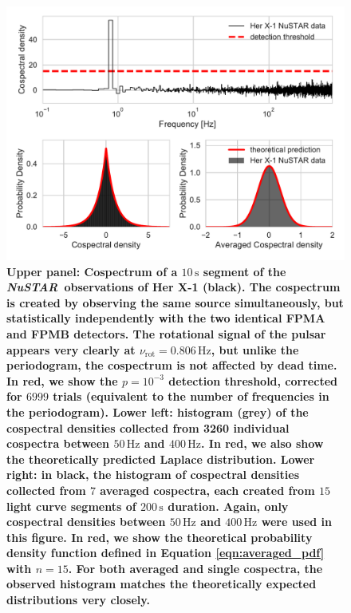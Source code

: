 \documentclass[12pt]{emulateapj}
\newcommand{\project}[1]{\textsl{#1}}
\newcommand{\nustar}{\project{NuSTAR}\xspace}
\begin{document}
\begin{bf}
\begin{figure}
\begin{center}
\includegraphics[width=\textwidth]{nustar_cospectra.pdf}
\caption{\textbf{Upper panel: Cospectrum of a $10\,\mathrm{s}$ segment of the \nustar\ observations of Her X-1 (black). The cospectrum is created by observing the same source simultaneously, but statistically independently with the two identical FPMA and FPMB detectors. The rotational signal of the pulsar appears very clearly at $\nu_\mathrm{rot} = 0.806\,\mathrm{Hz}$, but unlike the periodogram, the cospectrum is not affected by dead time. In red, we show the $p = 10^{-3}$ detection threshold, corrected for $6999$ trials (equivalent to the number of frequencies in the periodogram). Lower left:  histogram (grey) of the cospectral densities collected from 3260 individual cospectra between $50\,\mathrm{Hz}$ and $400\,\mathrm{Hz}$. In red, we also show the theoretically predicted Laplace distribution. Lower right: in black, the histogram of cospectral densities collected from $7$ averaged cospectra, each created from $15$ light curve segments of $200\,\mathrm{s}$ duration. Again, only cospectral densities between $50\,\mathrm{Hz}$ and $400\,\mathrm{Hz}$ were used in this figure. In red, we show the theoretical probability density function defined in Equation \ref{eqn:averaged_pdf} with $n = 15$. For both averaged and single cospectra, the observed histogram matches the theoretically expected distributions very closely.
}}
\label{fig:herx1_cs}
\end{center}
\end{figure}


\end{bf}
\end{document}
